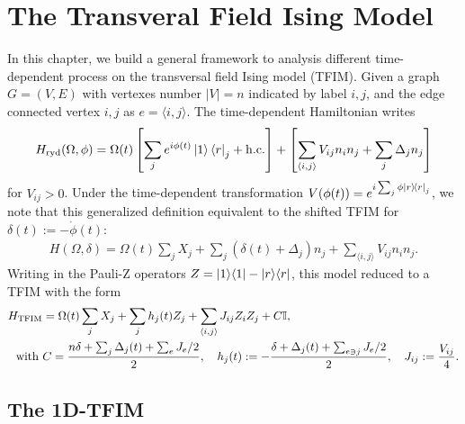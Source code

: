 \chapter{The Transveral Field Ising Model}


In this chapter, we build a general framework to analysis different time-dependent process on the transversal field Ising model (TFIM).
Given a graph $G = (V,E)$ with vertexes number $|V| = n$ indicated by label $i,j$, and the edge connected vertex $i,j$ as $e = \langle i, j \rangle$.
The time-dependent Hamiltonian writes
\begin{align}
    H_{\mathrm{ryd}}(\Omega, \phi) = \Omega(t)\left[ \sum_{j} e^{i \phi(t)} \ket{1}\bra{r}_j + \mathrm{h.c.}\right] + \left[\sum_{\langle i,j\rangle} V_{ij} n_i n_j + \sum_j \Delta_j n_j\right]
\end{align}
for $V_{ij}>0$.
Under the time-dependent transformation $V(\phi(t))=e^{i\sum_j \phi \ket{r}\!\bra{r}_j}$, we note that this generalized definition equivalent to the shifted TFIM for $\delta(t) := -\dot{\phi}(t)$:
\begin{align}
    H(\Omega, \delta) = \Omega(t)\sum_{j} X_j +   \sum_j (\delta(t)+ \Delta_j) n_j + \sum_{\langle i,j\rangle} V_{ij} n_i n_j.
\end{align}
Writing in the Pauli-Z operators $Z = \ket{1}\!\bra{1} -  \ket{r}\!\bra{r}$, this model reduced to a TFIM with the form 
\begin{align}
    H_{\rm TFIM} &= \Omega(t) \sum_{j} X_j  + \sum_j h_j(t) Z_j + \sum_{\langle i, j \rangle} J_{ij}Z_i Z_j + C \mathbb{I}, \\
    \text{with~} &C = \frac{n \delta + \sum_{j} \Delta_j(t) + \sum_{e} J_e/2}{2} , \quad h_j(t):=-\frac{\delta +  \Delta_j(t) + \sum_{e \ni j} J_{e}/2}{2} ,\quad J_{ij} := \frac{V_{ij}}{4}.
\end{align}



\section{The 1D-TFIM}

